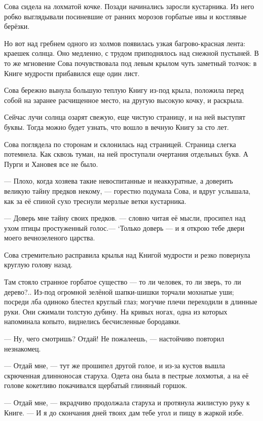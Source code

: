 \documentclass[oneside,final,14pt]{extreport}
\begin{document}
	Сова сидела на лохматой кочке. Позади начинались заросли кустарника. Из него робко выглядывали посиневшие от ранних морозов горбатые ивы и костлявые берёзки.
	
	Но вот над гребнем одного из холмов появилась узкая багрово-красная лента: краешек солнца. Оно медленно, с трудом приподнялось над снежной пустыней. В то же мгновение Сова почувствовала под левым крылом чуть заметный толчок: в Книге мудрости прибавился еще один лист.
	
	Сова бережно вынула большую теплую Книгу из-под крыла, положила перед собой на заранее расчищенное место, на другую высокую кочку, и раскрыла.
	
	Сейчас лучи солнца озарят свежую, еще чистую страницу, и на ней выступят буквы. Тогда можно будет узнать, что вошло в вечную Книгу за сто лет.
	
	Сова поглядела по сторонам и склонилась над страницей. Страница слегка потемнела. Как сквозь туман, на ней проступали очертания отдельных букв. А Пурги и Хановея все не было.
	
	— Плохо, когда хозяева такие невоспитанные и неаккуратные, а доверить великую тайну предков некому, — горестно подумала Сова, и вдруг услышала, как за её спиной сухо треснули мерзлые ветки кустарника.
	
	— Доверь мне тайну своих предков. — словно читая её мысли, просипел над ухом птицы простуженный голос.— ‘Только доверь — и я открою тебе двери моего вечнозеленого царства.
	
	Сова стремительно расправила крылья над Книгой мудрости и резко повернула круглую голову назад.
	
	Там стояло странное горбатое существо — то ли человек, то ли зверь, то ли дерево?.. Из-под огромной зелёной шапки-шишки торчали мохнатые уши; посреди лба одиноко блестел круглый глаз; могучие плечи переходили в длинные руки. Они сжимали толстую дубину. На кривых ногах, одна из которых напоминала копыто, виднелись бесчисленные бородавки.
	
	— Ну, чего смотришь? Отдай! Не пожалеешь, — настойчиво повторил незнакомец.
	
	— Отдай мне, — тут же прошипел другой голое, и из-за кустов вышла скрюченная длинноносая старуха. Одета она была в пестрые лохмотья, а на её голове кокетливо покачивался щербатый глиняный горшок.
	
	— Отдай мне, — вкрадчиво продолжала старуха и протянула жилистую руку к Книге. — И я до скончания дней твоих дам тебе угол и пищу в жаркой избе.
	
\end{document}
